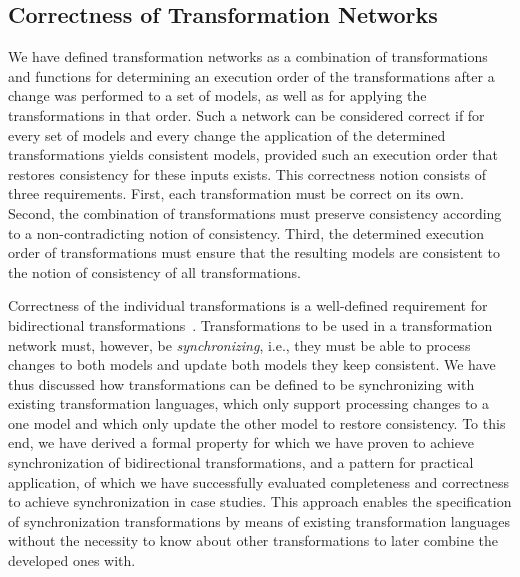 \subsection{Correctness of Transformation Networks}

We have defined transformation networks as a combination of transformations and functions for determining an execution order of the transformations after a change was performed to a set of models, as well as for applying the transformations in that order.
Such a network can be considered correct if for every set of models and every change the application of the determined transformations yields consistent models, provided such an execution order that restores consistency for these inputs exists.
This correctness notion consists of three requirements.
First, each transformation must be correct on its own. Second, the combination of transformations must preserve consistency according to a non-contradicting notion of consistency. Third, the determined execution order of transformations must ensure that the resulting models are consistent to the notion of consistency of all transformations.

Correctness of the individual transformations is a well-defined requirement for bidirectional transformations~\cite{stevens2010sosym}.
Transformations to be used in a transformation network must, however, be \emph{synchronizing}, i.e., they must be able to process changes to both models and update both models they keep consistent.
We have thus discussed how transformations can be defined to be synchronizing with existing transformation languages, which only support processing changes to a one model and which only update the other model to restore consistency.
To this end, we have derived a formal property for which we have proven to achieve synchronization of bidirectional transformations, and a pattern for practical application, of which we have successfully evaluated completeness and correctness to achieve synchronization in case studies.
This approach enables the specification of synchronization transformations by means of existing transformation languages without the necessity to know about other transformations to later combine the developed ones with.

